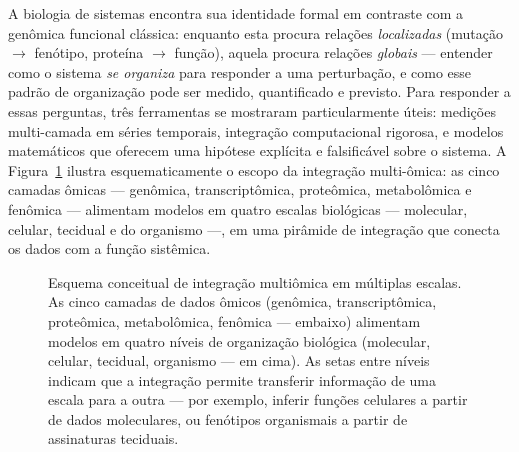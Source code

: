 A biologia de sistemas encontra sua identidade formal em contraste com a
genômica funcional clássica: enquanto esta procura relações \emph{localizadas}
(mutação $\to$ fenótipo, proteína $\to$ função), aquela procura relações
\emph{globais} --- entender como o sistema \emph{se organiza} para responder a
uma perturbação, e como esse padrão de organização pode ser medido,
quantificado e previsto. Para responder a essas perguntas, três ferramentas
se mostraram particularmente úteis: medições multi-camada em séries
temporais, integração computacional rigorosa, e modelos matemáticos que
oferecem uma hipótese explícita e falsificável sobre o sistema. A
Figura~\ref{fig:11-multiescala} ilustra esquematicamente o escopo da
integração multi-ômica: as cinco camadas ômicas --- genômica,
transcriptômica, proteômica, metabolômica e fenômica --- alimentam
modelos em quatro escalas biológicas --- molecular, celular, tecidual e
do organismo ---, em uma pirâmide de integração que conecta os dados
com a função sistêmica.

\begin{figure}[htbp]
\centering
{}
\caption{Esquema conceitual de integração multiômica em múltiplas escalas. As cinco camadas de dados ômicos (genômica, transcriptômica, proteômica, metabolômica, fenômica --- embaixo) alimentam modelos em quatro níveis de organização biológica (molecular, celular, tecidual, organismo --- em cima). As setas entre níveis indicam que a integração permite transferir informação de uma escala para a outra --- por exemplo, inferir funções celulares a partir de dados moleculares, ou fenótipos organismais a partir de assinaturas teciduais.}
\label{fig:11-multiescala}
\end{figure}


